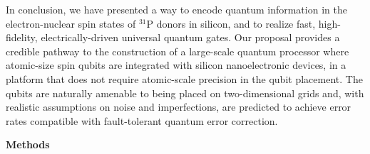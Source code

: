 \documentclass[aps,prb,superscriptaddress,nobibnotes,twocolumn]{revtex4-1}
\begin{document}
In conclusion, we have presented a way to encode quantum information in the electron-nuclear spin states of $^{31}$P donors in silicon, and to realize fast, high-fidelity, electrically-driven universal quantum gates. Our proposal provides a credible pathway to the construction of a large-scale quantum processor where atomic-size spin qubits are integrated with silicon nanoelectronic devices, in a platform that does not require atomic-scale precision in the qubit placement. The qubits are naturally amenable to being placed on two-dimensional grids and, with realistic assumptions on noise and imperfections, are predicted to achieve error rates compatible with fault-tolerant quantum error correction.


\vspace{3mm}
\noindent\textbf{Methods}
\end{document}
